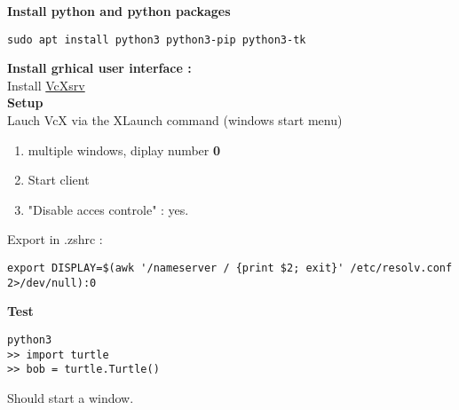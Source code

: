 \documentclass[12pt]{article}
\begin{document}
\textbf{Install python and python packages }
\begin{verbatim}
sudo apt install python3 python3-pip python3-tk 
\end{verbatim}

\textbf{Install grhical user interface :} \\
Install \href{https://sourceforge.net/projects/vcxsrv/}{VcXsrv}\\

\textbf{Setup}\\
Lauch VcX via the XLaunch command (windows start menu)\\
\begin{enumerate}
  \item multiple windows, diplay number \textbf{0}
  \item Start client
  \item "Disable acces controle" : yes.
\end{enumerate}

Export in .zshrc : 
\begin{verbatim}
export DISPLAY=$(awk '/nameserver / {print $2; exit}' /etc/resolv.conf 2>/dev/null):0
\end{verbatim}
\textbf{Test}
\begin{verbatim}
python3 
>> import turtle 
>> bob = turtle.Turtle()
\end{verbatim}
Should start a window.
\end{document}
